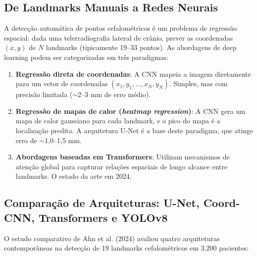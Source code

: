 \subsection{De Landmarks Manuais a Redes Neurais}

A detecção automática de pontos cefalométricos é um problema de regressão espacial: dada uma telerradiografia lateral de crânio, prever as coordenadas $(x, y)$ de $N$ landmarks (tipicamente 19--33 pontos). As abordagens de deep learning podem ser categorizadas em três paradigmas:

\begin{enumerate}
    \item \textbf{Regressão direta de coordenadas}: A CNN mapeia a imagem diretamente para um vetor de coordenadas $(x_1, y_1, ..., x_N, y_N)$. Simples, mas com precisão limitada ($\sim$2--3 mm de erro médio).

    \item \textbf{Regressão de mapas de calor (\textit{heatmap regression})}: A CNN gera um mapa de calor gaussiano para cada landmark, e o pico do mapa é a localização predita. A arquitetura U-Net é a base deste paradigma, que atinge erro de $\sim$1,0--1,5 mm.

    \item \textbf{Abordagens baseadas em Transformers}: Utilizam mecanismos de atenção global para capturar relações espaciais de longo alcance entre landmarks. O estado da arte em 2024.
\end{enumerate}

\subsection{Comparação de Arquiteturas: U-Net, Coord-CNN, Transformers e YOLOv8}

O estudo comparativo de Ahn et al. (2024) avaliou quatro arquiteturas contemporâneas na detecção de 19 landmarks cefalométricos em 3.200 pacientes:


